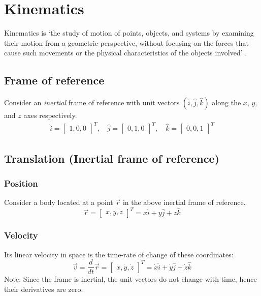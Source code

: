 
\chapter{Kinematics}
Kinematics is `the study of motion of points, objects, and systems by examining their motion from a geometric perspective, without focusing on the forces that cause such movements or the physical characteristics of the objects involved' \cite{geeks_kinematics}.

\section{Frame of reference}
Consider an \textit{inertial} frame of reference with unit vectors \((\hat{i}, \hat{j}, \hat{k})\) along the \(x\), \(y\), and \(z\) axes respectively. \\
\begin{equation} \nonumber
    \begin{aligned}
        \hat{i} = \begin{bmatrix}
                      1,0,0
                  \end{bmatrix}^T, \quad
        \hat{j} = \begin{bmatrix}
                      0,1,0
                  \end{bmatrix}^T, \quad
        \hat{k} = \begin{bmatrix}
                      0,0,1
                  \end{bmatrix}^T
    \end{aligned}
\end{equation}

\section{Translation (Inertial frame of reference)}

\subsection{Position}
Consider a body located at a point \(\vec{r}\) in the above inertial frame of reference.
\begin{equation} \nonumber
    \vec{r} =
    \begin{bmatrix}
        x, y, z
    \end{bmatrix}^T
    = x \hat{i} + y \hat{j} + z \hat{k}
\end{equation}

\subsection{Velocity}
Its linear velocity in space is the time-rate of change of these coordinates:
\begin{equation} \nonumber
    \vec{v} = \frac{d}{dt}
    \vec{r} =
    \begin{bmatrix}
        \dot{x}, \dot{y}, \dot{z}
    \end{bmatrix}^T =
    \dot{x} \hat{i} + \dot{y} \hat{j} + \dot{z} \hat{k}
\end{equation}
Note: Since the frame is inertial, the unit vectors do not change with time, hence their derivatives are zero.

